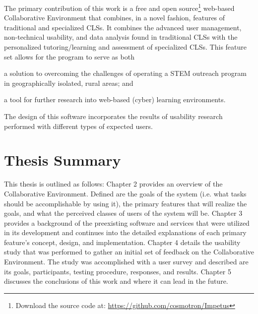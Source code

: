 The primary contribution of this work is a free and open source\footnote{Download the source code at: \url{https://github.com/cosmotron/Impetus}} web-based Collaborative Environment that combines, in a novel fashion, features of traditional and specialized CLSs. It combines the advanced user management, non-technical usability, and data analysis found in traditional CLSs with the personalized tutoring/learning and assessment of specialized CLSs. This feature set allows for the program to serve as both
\begin{inparaenum}[\itshape 1\upshape)]
	\item a solution to overcoming the challenges of operating a STEM outreach program in geographically isolated, rural areas; and
	\item a tool for further research into web-based (cyber) learning environments.
\end{inparaenum} The design of this software incorporates the results of usability research performed with different types of expected users.

\section{Thesis Summary}
This thesis is outlined as follows: Chapter 2 provides an overview of the Collaborative Environment. Defined are the goals of the system (i.e. what tasks should be accomplishable by using it), the primary features that will realize the goals, and what the perceived classes of users of the system will be. Chapter 3 provides a background of the preexisting software and services that were utilized in its development and continues into the detailed explanations of each primary feature's concept, design, and implementation. Chapter 4 details the usability study that was performed to gather an initial set of feedback on the Collaborative Environment. The study was accomplished with a user survey and described are its goals, participants, testing procedure, responses, and results. Chapter 5 discusses the conclusions of this work and where it can lead in the future.


